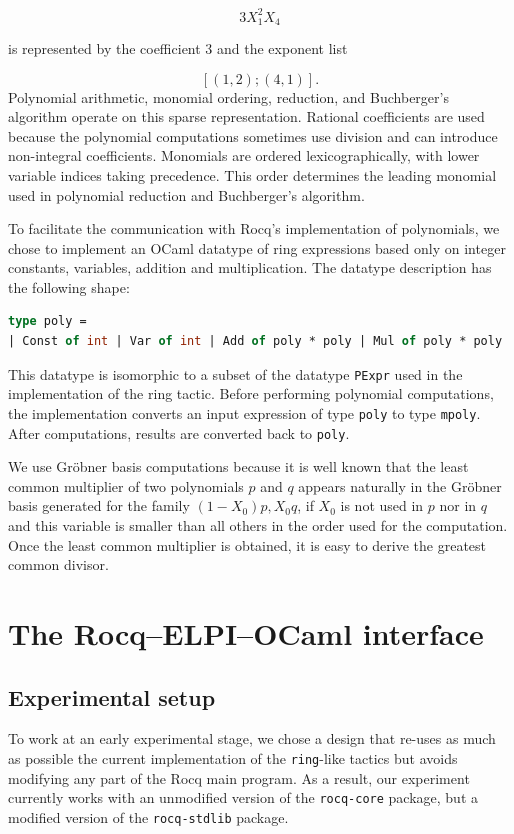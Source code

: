 \documentclass{jflart}
\begin{document}
$$
  3X_1^2X_4
$$

is represented by the coefficient $3$ and the exponent list

$$
  [(1,2);(4,1)].
$$
Polynomial arithmetic, monomial ordering, reduction, and Buchberger's
algorithm operate on this sparse representation. Rational coefficients
are used because the polynomial computations sometimes use division
and can introduce non-integral coefficients. Monomials are ordered
lexicographically, with lower variable indices taking precedence. This order
determines the leading monomial used in polynomial reduction and
Buchberger's algorithm.

To facilitate the communication with Rocq's implementation of polynomials, we
chose to implement an OCaml datatype of ring expressions based only on integer constants, variables, addition and
multiplication.  The datatype description has the following shape:
\begin{lstlisting}[language=ML]
type poly =
| Const of int | Var of int | Add of poly * poly | Mul of poly * poly
\end{lstlisting}
This datatype is isomorphic to a subset of the datatype \texttt{PExpr} used in
the implementation of the ring tactic.
Before performing polynomial computations, the implementation converts an
input expression of type \texttt{poly}
to type \texttt{mpoly}.  After computations, results are converted back
to \texttt{poly}.

We use Gröbner basis computations because it is well known that the
least common multiplier of two polynomials \(p\) and \(q\) appears naturally
in the Gröbner basis generated for the family \((1 - X_0) p, X_0 q\), if \(X_0\)
is not used in \(p\) nor in \(q\) and this variable is smaller than all others in the
order used for the computation.  Once the least common multiplier is obtained,
it is easy to derive the greatest common divisor.

\section{The Rocq--ELPI--OCaml interface}
\subsection{Experimental setup}
To work at an early experimental stage, we chose a design that re-uses as
much as possible the current implementation of the \texttt{ring}-like
tactics but avoids modifying
any part of the Rocq main program.  As a result, our experiment
currently works with an unmodified version of the \texttt{rocq-core}
package, but a modified version of the \texttt{rocq-stdlib} package.
\end{document}
